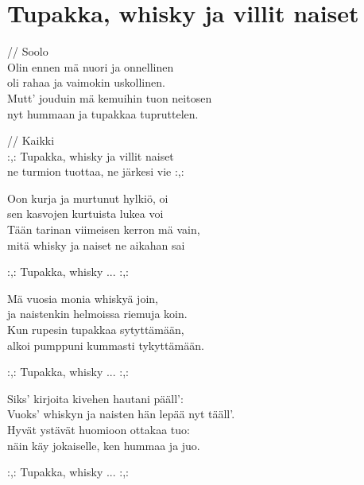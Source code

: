 \section{Tupakka, whisky ja villit naiset}

// Soolo\\
Olin ennen mä nuori ja onnellinen\\
oli rahaa ja vaimokin uskollinen.\\
Mutt’ jouduin mä kemuihin tuon neitosen\\
nyt hummaan ja tupakkaa tupruttelen.

// Kaikki\\
:,: Tupakka, whisky ja villit naiset\\
ne turmion tuottaa, ne järkesi vie :,:

Oon kurja ja murtunut hylkiö, oi\\
sen kasvojen kurtuista lukea voi\\
Tään tarinan viimeisen kerron mä vain,\\
mitä whisky ja naiset ne aikahan sai

:,: Tupakka, whisky ... :,:

Mä vuosia monia whiskyä join,\\ 
ja naistenkin helmoissa riemuja koin.\\
Kun rupesin tupakkaa sytyttämään,\\
alkoi pumppuni kummasti tykyttämään.

:,: Tupakka, whisky ... :,:

Siks’ kirjoita kivehen hautani pääll’:\\
Vuoks’ whiskyn ja naisten hän lepää nyt tääll’.\\
Hyvät ystävät huomioon ottakaa tuo:\\
näin käy jokaiselle, ken hummaa ja juo.

:,: Tupakka, whisky ... :,: